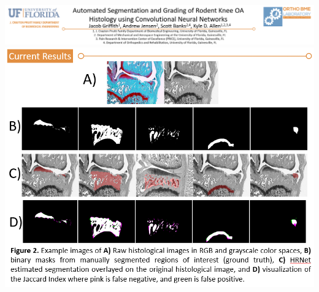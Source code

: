 
\begin{frame}
   \centering
      \includegraphics[width=\linewidth]{images/histology-title.png}
      \vfill
      \includegraphics[width=0.65\linewidth]{images/histology-images.png}
\end{frame}

